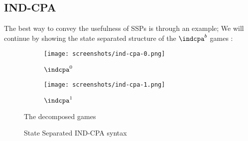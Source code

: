 \documentclass[bsc,frontabs,singlespacing,parskip,deptreport]{infthesis}
\begin{document}
\subsection{IND-CPA}
The best way to convey the usefulness of SSPs is through an example; We will continue by showing the state separated structure of the {$\indcpa^b$} games :
{

\begin{figure}[!h]
\centering
\begin{subfigure}{.5\textwidth}
  \centering
    \texttt{[image: screenshots/ind-cpa-0.png]}
    \caption{$\indcpa^0$}
  \label{fig:sub1}
\end{subfigure}%
\begin{subfigure}{.5\textwidth}
  \centering
    \texttt{[image: screenshots/ind-cpa-1.png]}
  \label{fig:sub2}
    \caption{$\indcpa^1$}
\end{subfigure}
\caption{The decomposed {\indcpa} games}
\label{fig:indgraph}
\end{figure}

\begin{figure}
\centering
\vspace{0.3cm}
\begin{minipage}{\textwidth}
\begin{center}
\end{center}
\end{minipage}
\caption{State Separated IND-CPA syntax\label{fig:sspindcode}}
\end{figure}
}
\end{document}
